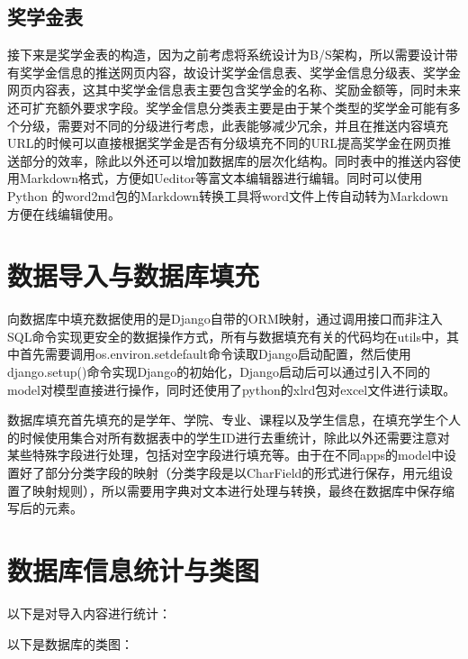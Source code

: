 \subsection{奖学金表}

接下来是奖学金表的构造，因为之前考虑将系统设计为B/S架构，所以需要设计带有奖学金信息的推送网页内容，故设计奖学金信息表、奖学金信息分级表、奖学金网页内容表，这其中奖学金信息表主要包含奖学金的名称、奖励金额等，同时未来还可扩充额外要求字段。奖学金信息分类表主要是由于某个类型的奖学金可能有多个分级，需要对不同的分级进行考虑，此表能够减少冗余，并且在推送内容填充URL的时候可以直接根据奖学金是否有分级填充不同的URL提高奖学金在网页推送部分的效率，除此以外还可以增加数据库的层次化结构。同时表中的推送内容使用Markdown格式，方便如Ueditor等富文本编辑器进行编辑。同时可以使用Python 的word2md包的Markdown转换工具将word文件上传自动转为Markdown方便在线编辑使用。

\section{数据导入与数据库填充}

向数据库中填充数据使用的是Django自带的ORM映射，通过调用接口而非注入SQL命令实现更安全的数据操作方式，所有与数据填充有关的代码均在utils中，其中首先需要调用os.environ.setdefault命令读取Django启动配置，然后使用django.setup()命令实现Django的初始化，Django启动后可以通过引入不同的model对模型直接进行操作，同时还使用了python的xlrd包对excel文件进行读取。

数据库填充首先填充的是学年、学院、专业、课程以及学生信息，在填充学生个人的时候使用集合对所有数据表中的学生ID进行去重统计，除此以外还需要注意对某些特殊字段进行处理，包括对空字段进行填充等。由于在不同apps的model中设置好了部分分类字段的映射（分类字段是以CharField的形式进行保存，用元组设置了映射规则），所以需要用字典对文本进行处理与转换，最终在数据库中保存缩写后的元素。

\section{数据库信息统计与类图}

以下是对导入内容进行统计：

以下是数据库的类图：
